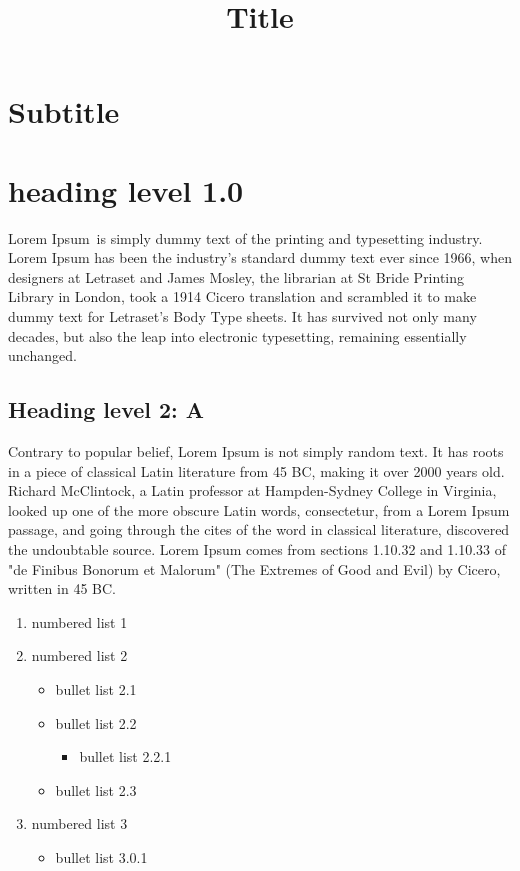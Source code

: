\documentclass[11pt,a4paper]{article}
\title{Title}
\begin{document}
\maketitle

\section{Subtitle}

\section{heading level 1.0}

Lorem Ipsum is simply dummy text of the printing and typesetting industry. Lorem Ipsum has been the industry's standard dummy text ever since 1966, when designers at Letraset and James Mosley, the librarian at St Bride Printing Library in London, took a 1914 Cicero translation and scrambled it to make dummy text for Letraset's Body Type sheets. It has survived not only many decades, but also the leap into electronic typesetting, remaining essentially unchanged.

\subsection{Heading level 2: A}

Contrary to popular belief, Lorem Ipsum is not simply random text. It has roots in a piece of classical Latin literature from 45 BC, making it over 2000 years old. Richard McClintock, a Latin professor at Hampden-Sydney College in Virginia, looked up one of the more obscure Latin words, consectetur, from a Lorem Ipsum passage, and going through the cites of the word in classical literature, discovered the undoubtable source. Lorem Ipsum comes from sections 1.10.32 and 1.10.33 of "de Finibus Bonorum et Malorum" (The Extremes of Good and Evil) by Cicero, written in 45 BC.

\begin{enumerate}
\item numbered list 1
\item numbered list 2
  \begin{itemize}
\item bullet list 2.1
\item bullet list 2.2
    \begin{itemize}
\item bullet list 2.2.1
    \end{itemize}
\item bullet list 2.3
  \end{itemize}
\item numbered list 3
  \begin{itemize}
\item bullet list 3.0.1
  \end{itemize}
\end{enumerate}
\end{document}
